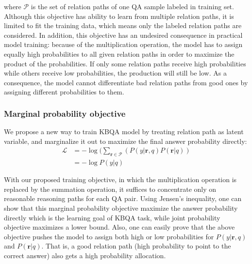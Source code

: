 where $\mathcal{P}$ is the set of relation paths of one QA sample labeled in training set. Although this objective has ability to learn from multiple relation paths, it is limited to fit the training data, which means only the labeled relation paths are considered.
 In addition, this objective has an undesired consequence in practical model training: because of the multiplication operation, the model has to assign equally high probabilities to all given relation paths in order to maximize the product of the probabilities. If only some relation paths receive high probabilities while others receive low probabilities, the production will still be low. As a consequence, the model cannot differentiate bad relation paths from good ones by assigning different probabilities to them.

\subsubsection{Marginal probability objective} We propose a new way to train KBQA model by treating relation path as latent variable, and marginalize it out to maximize the final answer probability directly:
\begin{equation}
\begin{aligned}
\mathcal{L} &=  -\log(\sum_{\mathbf{r}\in \mathcal{P}}( P(y|\mathbf{r},q)P(\mathbf{r}|q))\\
            &= -\log P(y|q)
\end{aligned}
\label{obj:latent}
\end{equation}

With our proposed training objective, in which the multiplication operation is replaced by the summation operation, it suffices to concentrate only on reasonable reasoning paths for each QA pair. Using Jensen's inequality, one can show that this marginal probability objective maximize the answer probability directly which is the learning goal of KBQA task, while joint probability objective maximizes a lower bound. Also, one can easily prove that the above objective pushes the model to assign both high or low probabilities for $P(y|\mathbf{r},q)$ and $P(\mathbf{r}|q)$. That is, a good relation path (high probability to point to the correct answer) also gets a high probability allocation. %


